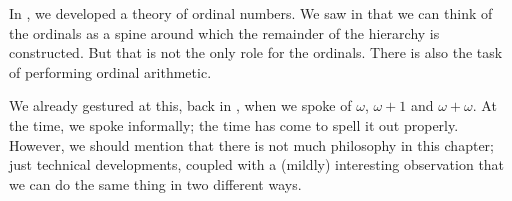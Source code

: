 \documentclass[../../../include/open-logic-section]{subfiles}
\begin{document}


In , we developed a theory of ordinal numbers.
We saw in  that we can think of the ordinals as a
spine around which the remainder of the hierarchy is constructed. But
that is not the only role for the ordinals. There is also the task of
performing ordinal arithmetic. 

We already gestured at this, back in
, when we spoke of $\omega$,
$\omega+1$ and $\omega+\omega$. At the time, we spoke informally; the
time has come to spell it out properly. However, we should mention
that there is not much philosophy in this chapter; just technical
developments, coupled with a (mildly) interesting observation that we
can do the same thing in two different ways.
\end{document}
